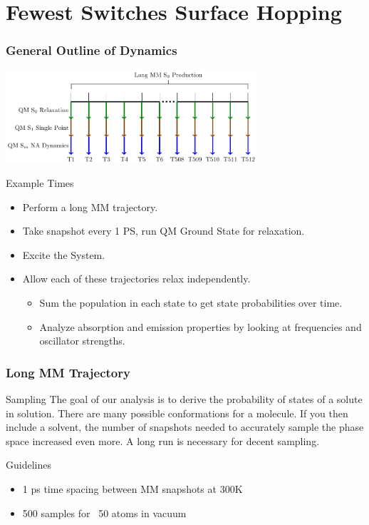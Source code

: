 \documentclass{beamer}
\begin{document}
\section{Fewest Switches Surface Hopping}
\begin{frame}
  \frametitle{General Outline of Dynamics}
  \includegraphics[width=0.7\textwidth]{Images/simulations}
\begin{block}{Example Times}
\begin{itemize}
    \item Perform a long MM trajectory.
    \item Take snapshot every 1 PS, run QM Ground State for relaxation.
    \item Excite the System.
    \item Allow each of these trajectories relax independently.
    \begin{itemize}
      \item Sum the population in each state to get state probabilities over time.
      \item Analyze absorption and emission properties by looking at frequencies and oscillator strengths.
    \end{itemize}
\end{itemize}

\end{block}
\end{frame}

\begin{frame}
  \frametitle{Long MM Trajectory}
\begin{block}{Sampling}
    The goal of our analysis is to derive the probability of states of a solute in solution.
    There are many possible conformations for a molecule. If you
    then include a solvent, the number of snapshots needed to accurately sample
    the phase space increased even more. A long run is necessary for decent sampling.
\end{block}
\begin{block}{Guidelines}
 \begin{itemize}
  \item 1 ps time spacing between MM snapshots at 300K
  \item 500 samples for ~50 atoms in vacuum
 \end{itemize}
\end{block}
\end{frame}
\end{document}
